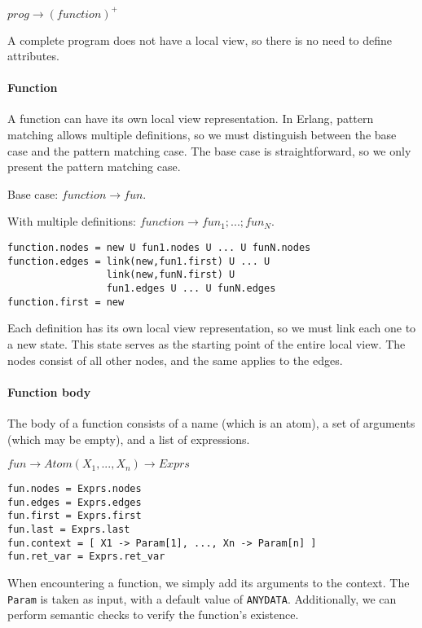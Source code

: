 \bigskip

\noindent $prog \to (function)^+$

\bigskip

A complete program does not have a local view, so there is no need  
to define attributes.  

\paragraph{Function}  
A function can have its own local view representation.  
In Erlang, pattern matching allows multiple definitions,  
so we must distinguish between the base case and the  
pattern matching case. The base case is straightforward,  
so we only present the pattern matching case.  

\bigskip

\noindent Base case: $function \to fun.$

\noindent With multiple definitions: $function \to fun_1;...;fun_N.$

\begin{verbatim}
function.nodes = new U fun1.nodes U ... U funN.nodes
function.edges = link(new,fun1.first) U ... U 
                 link(new,funN.first) U 
                 fun1.edges U ... U funN.edges
function.first = new
\end{verbatim}

Each definition has its own local view representation, so we must link  
each one to a new state. This state serves as the starting point of  
the entire local view. The nodes consist of all other nodes, and  
the same applies to the edges.  

\paragraph{Function body}  
The body of a function consists of a name (which is an atom),  
a set of arguments (which may be empty), and a list of expressions.  

\bigskip

\noindent $fun \to Atom(X_1,...,X_n) \to Exprs$

\begin{verbatim}
fun.nodes = Exprs.nodes
fun.edges = Exprs.edges
fun.first = Exprs.first
fun.last = Exprs.last
fun.context = [ X1 -> Param[1], ..., Xn -> Param[n] ]
fun.ret_var = Exprs.ret_var
\end{verbatim}

When encountering a function, we simply add its arguments to the context.  
The \texttt{Param} is taken as input, with a default value of \texttt{ANYDATA}.  
Additionally, we can perform semantic checks to verify the function’s  
existence.  


